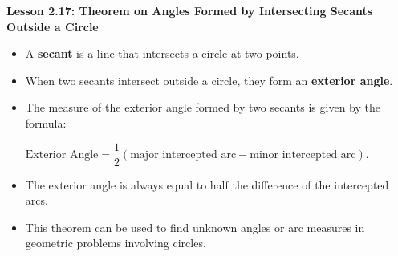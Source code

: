 \begin{center}
\textbf{Lesson 2.17: Theorem on Angles Formed by Intersecting Secants Outside a Circle}
\end{center}

\vspace*{-1.5ex}

\begin{itemize}
    \item A \textbf{secant} is a line that intersects a circle at two points.
    \item When two secants intersect outside a circle, they form an \textbf{exterior angle}.
    \item The measure of the exterior angle formed by two secants is given by the formula:

{\centering $
    \text{Exterior Angle} = \dfrac{1}{2} (\text{major intercepted arc} - \text{minor intercepted arc}).
$\par}
    \item The exterior angle is always equal to half the difference of the intercepted arcs.
    \item This theorem can be used to find unknown angles or arc measures in geometric problems involving circles.
\end{itemize}
